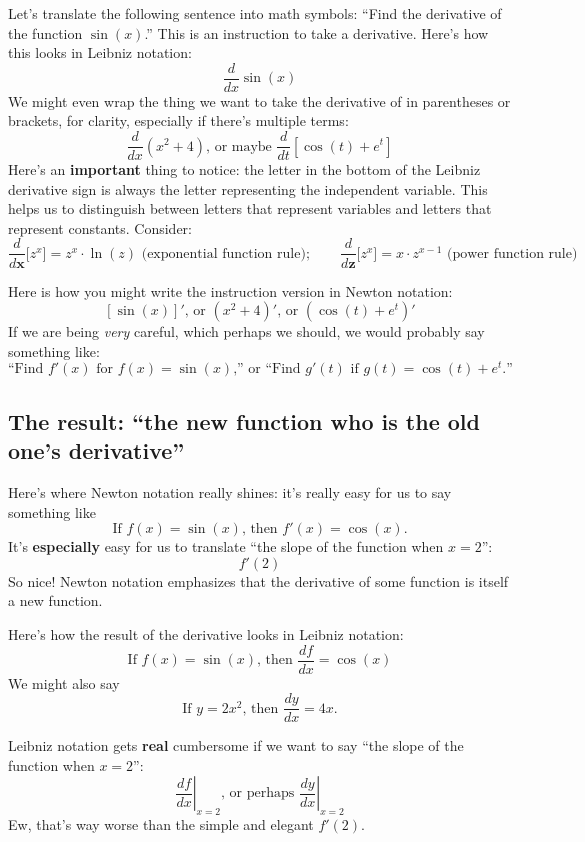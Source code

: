     Let's translate the following sentence into math symbols: ``Find the derivative of the function $\sin(x)$.'' This is an instruction to take a derivative. Here's how this looks in Leibniz notation:
    \[\frac{d}{dx} \sin(x)\]
    We might even wrap the thing we want to take the derivative of in parentheses or brackets, for clarity, especially if there's multiple terms:
    \[\frac{d}{dx}(x^2+4) \textrm{, or maybe } \frac{d}{dt}\left[\cos(t) + e^t\right]\]
    Here's an \textbf{important} thing to notice: the letter in the bottom of the Leibniz derivative sign is always the letter representing the independent variable. This helps us to distinguish between letters that represent variables and letters that represent constants. Consider:
    \[\dfrac{d}{d\mathbf{x}} \Big[z^x\Big]  = z^x \cdot \ln(z)
    \text{ (exponential function rule)}; \qquad \dfrac{d}{d\mathbf{z}} \Big[z^x\Big] = x\cdot z^{x-1}
    \text{ (power function rule)}\]
    
    Here is how you might write the instruction version in Newton notation:
    \[\left[\sin(x)\right]' \textrm{, or } (x^2+4)' \textrm{, or } (\cos(t) + e^t)'\]
    If we are being \textit{very} careful, which perhaps we should, we would probably say something like:
    \[\text{``Find } f'(x) \text{ for } f(x) = \sin(x)\textrm{,'' or ``Find } g'(t) \text{ if } g(t) = \cos(t) + e^t\text{.''}\]
    
    \subsection*{The result: ``the new function who is the old one's derivative''}
    
    Here's where Newton notation really shines: it's really easy for us to say something like 
    \[\textrm{If } f(x) = \sin(x) \textrm{, then } f'(x) = \cos(x).\]
	It's \textbf{especially} easy for us to translate ``the slope of the function when $x = 2$'':
	\[f'(2)\]
	So nice! Newton notation emphasizes that the derivative of some function is itself a new function.
	
	Here's how the result of the derivative looks in Leibniz notation:
	\[\textrm{If } f(x) = \sin(x) \textrm{, then } \frac{df}{dx} = \cos(x)\]
	We might also say
	\[\textrm{If } y = 2x^2 \textrm{, then } \frac{dy}{dx} = 4x.\]
	
	Leibniz notation gets \textbf{real} cumbersome if we want to say ``the slope of the function when $x=2$'':
	\[ \left.\frac{df}{dx}\right|_{x=2} \textrm{, or perhaps } \left.\frac{dy}{dx}\right|_{x=2}\]
	Ew, that's way worse than the simple and elegant $f'(2)$.
	
